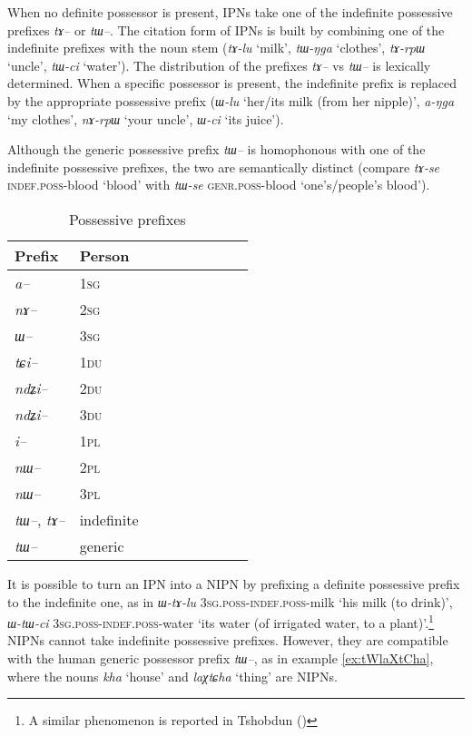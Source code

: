 \documentclass[oldfontcommands,oneside,a4paper,11pt]{article}
\newcommand{\ipa}[1]{{\phon\textit{#1}}} %
\begin{document}
When no definite possessor is present, IPNs take one of the indefinite possessive prefixes \ipa{tɤ--} or \ipa{tɯ--}. The citation form of IPNs is built by combining one of the indefinite prefixes with the noun stem (\ipa{tɤ-lu} `milk', \ipa{tɯ-ŋga} `clothes', \ipa{tɤ-rpɯ} `uncle', \ipa{tɯ-ci} `water'). The distribution of the prefixes \ipa{tɤ--} vs \ipa{tɯ--} is lexically determined.  When a specific possessor is present, the indefinite prefix is replaced by the appropriate possessive prefix (\ipa{ɯ-lu} `her/its milk (from her nipple)', \ipa{a-ŋga} `my clothes', \ipa{nɤ-rpɯ} `your uncle', \ipa{ɯ-ci} `its juice'). 

Although the generic possessive prefix \ipa{tɯ--} is homophonous with one of the indefinite possessive prefixes, the two are semantically distinct (compare \ipa{tɤ-se} \textsc{indef.poss}-blood `blood' with \ipa{tɯ-se} \textsc{genr.poss}-blood `one's/people's blood').

\begin{table}[h] \centering
\caption{Possessive prefixes }\label{tab:possessive}
\begin{tabular}{lllllllll} 
\toprule
 Prefix & Person\\
\midrule
\ipa{a--}  & 1\textsc{sg} \\
\ipa{nɤ--}  & 2\textsc{sg}\\
\ipa{ɯ--}  & 3\textsc{sg}\\
\midrule
\ipa{tɕi--}  &  1\textsc{du} \\
\ipa{ndʑi--}  & 2\textsc{du} \\	
\ipa{ndʑi--}  & 3\textsc{du} \\	
\midrule
\ipa{i--}  & 1\textsc{pl} \\
\ipa{nɯ--}  & 2\textsc{pl} \\
\ipa{nɯ--}  & 3\textsc{pl} \\
\midrule
\ipa{tɯ--},  \ipa{tɤ--} & indefinite \\
\ipa{tɯ--}   &  generic \\
\bottomrule
\end{tabular}
\end{table}

It is possible to turn an IPN into a NIPN by prefixing a definite possessive prefix to the indefinite one, as in \ipa{ɯ-tɤ-lu} \textsc{3sg.poss-indef.poss}-milk `his milk (to drink)', \ipa{ɯ-tɯ-ci} \textsc{3sg.poss-indef.poss}-water `its water (of irrigated water, to a plant)'.\footnote{A similar phenomenon is reported in Tshobdun (\citealt[140]{jackson98morphology})} NIPNs cannot take indefinite possessive prefixes. However, they are compatible with the human generic possessor prefix \ipa{tɯ--}, as in example \ref{ex:tWlaXtCha}, where the nouns \ipa{kha} `house' and \ipa{laχtɕha} `thing' are NIPNs.
\end{document}
